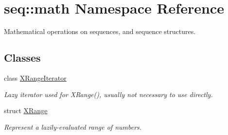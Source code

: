 \hypertarget{namespaceseq_1_1math}{\section{seq\-:\-:math Namespace Reference}
\label{namespaceseq_1_1math}
}


Mathematical operations on sequences, and sequence structures.  


\subsection*{Classes}
\begin{DoxyCompactItemize}
\item 
class \hyperlink{classseq_1_1math_1_1_x_range_iterator}{X\-Range\-Iterator}
\begin{DoxyCompactList}\small\item\em Lazy iterator used for X\-Range(), usually not necessary to use directly. \end{DoxyCompactList}\item 
struct \hyperlink{structseq_1_1math_1_1_x_range}{X\-Range}
\begin{DoxyCompactList}\small\item\em Represent a lazily-\/evaluated range of numbers. \end{DoxyCompactList}\end{DoxyCompactItemize}
